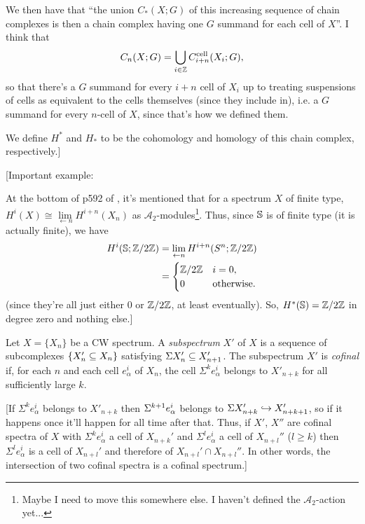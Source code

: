 \documentclass{MetricNotes2023}
\def\bb{\ensuremath\mathbb}
\def\subq{\ensuremath\subseteq}
\def\inj{\ensuremath\hookrightarrow}
\def\inte{\ensuremath\mathbb{Z}}
\def\del{\ensuremath\partial}
\def\SIgma{\ensuremath\Sigma}
\def\A{\ensuremath{\mathscr{A}_2}}
\begin{document}
We then have that ``the union \(C_*(X ; G)\) of this increasing sequence of chain complexes is then a chain complex having one \(G\) summand for each cell of \(X\)''. I think that 
\[C_n(X ; G)=\bigcup_{i\in \inte}C^\text{cell}_{i+n}(X_i; G),\] 
so that there's a \(G\) summand for every \(i+n\) cell of \(X_i\) up to treating suspensions of cells as equivalent to the cells themselves (since they include in), i.e. a \(G\) summand for every \(n\)-cell of \(X\), since that's how we defined them.


We define \(H^*\) and \(H_*\) to be the cohomology and homology of this chain complex, respectively.]

[Important example:

At the bottom of p592 of \autocite{hatcher5}, it's mentioned that for a spectrum \(X\) of finite type, \(H^i(X)\cong \lim\limits_{\leftarrow n}H^{i+n}(X_n)\) as \(\mathscr{A}_2\)-modules\footnote{Maybe I need to move this somewhere else. I haven't  defined the \(\A\)-action yet...}. Thus, since \(\bb{S}\) is of finite type (it is actually finite), we have
\begin{align*}
H^i(\bb{S}; \inte/2\inte)&=\lim\limits_{\leftarrow n}H^{i+n}(S^n; \inte/2\inte)\\
&=\begin{cases}
\inte/2\inte & i = 0,\\
0 & \text{otherwise.}
\end{cases}
\end{align*}
(since they're all just either \(0\) or \(\inte/2\inte\), at least eventually). So, \(H^*(\bb{S})=\inte/2\inte\) in degree zero and nothing else.]

\begin{definition}
Let \(X=\{X_n\}\) be a CW spectrum. A \textit{subspectrum} \(X'\) of \(X\) is a sequence of subcomplexes \(\{X_n'\subq X_n\}\) satisfying \(\Sigma X_n'\subq X_{n+1}'\). The subspectrum \(X'\) is \textit{cofinal} if, for each \(n\) and each cell \(e^i_\alpha\) of \(X_n\), the cell \(\Sigma^k e_\alpha^i\) belongs to \(X'_{n+k}\) for all sufficiently large \(k\).
\end{definition}

[If \(\Sigma^ke^i_\alpha\) belongs to \(X'_{n+k}\) then \(\SIgma^{k+1}e^i_\alpha\) belongs to \(\Sigma X'_{n+k}\inj X'_{n+k+1}\), so if it happens once it'll happen for all time after that. Thus, if \(X'\), \(X''\) are cofinal spectra of \(X\) with \(\Sigma^k e_{\alpha}^i\) a cell of \(X_{n+k}'\) and \(\Sigma^l e_\alpha^i\) a cell of \(X_{n+l}''\) (\(l\geq k\)) then \(\Sigma^l e_\alpha^i\) is a cell of \(X_{n+l}'\) and therefore of \(X_{n+l}'\cap X_{n+l}''\). In other words, the intersection of two cofinal spectra is a cofinal spectrum.]
\end{document}

